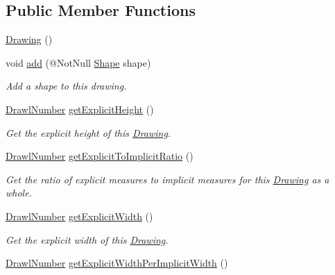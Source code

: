 \subsection*{Public Member Functions}
\begin{DoxyCompactItemize}
\item 
\hyperlink{classcom_1_1aarrelaakso_1_1drawl_1_1_drawing_adc398fbdb9acaa2c09ab8f048ff45109}{Drawing} ()
\item 
void \hyperlink{classcom_1_1aarrelaakso_1_1drawl_1_1_drawing_a4b9877c446f162bd2705a2dba4bf04bc}{add} (@Not\+Null \hyperlink{classcom_1_1aarrelaakso_1_1drawl_1_1_shape}{Shape} shape)
\begin{DoxyCompactList}\small\item\em Add a shape to this drawing. \end{DoxyCompactList}\item 
\hyperlink{classcom_1_1aarrelaakso_1_1drawl_1_1_drawl_number}{Drawl\+Number} \hyperlink{classcom_1_1aarrelaakso_1_1drawl_1_1_drawing_a348e6da7ba49b56f8ea1fad037936337}{get\+Explicit\+Height} ()
\begin{DoxyCompactList}\small\item\em Get the explicit height of this \hyperlink{classcom_1_1aarrelaakso_1_1drawl_1_1_drawing}{Drawing}. \end{DoxyCompactList}\item 
\hyperlink{classcom_1_1aarrelaakso_1_1drawl_1_1_drawl_number}{Drawl\+Number} \hyperlink{classcom_1_1aarrelaakso_1_1drawl_1_1_drawing_a586f764563210b252eef4c35b2679cd3}{get\+Explicit\+To\+Implicit\+Ratio} ()
\begin{DoxyCompactList}\small\item\em Get the ratio of explicit measures to implicit measures for this \hyperlink{classcom_1_1aarrelaakso_1_1drawl_1_1_drawing}{Drawing} as a whole. \end{DoxyCompactList}\item 
\hyperlink{classcom_1_1aarrelaakso_1_1drawl_1_1_drawl_number}{Drawl\+Number} \hyperlink{classcom_1_1aarrelaakso_1_1drawl_1_1_drawing_aa3154a900c39b56463f485f7b8b3bb5a}{get\+Explicit\+Width} ()
\begin{DoxyCompactList}\small\item\em Get the explicit width of this \hyperlink{classcom_1_1aarrelaakso_1_1drawl_1_1_drawing}{Drawing}. \end{DoxyCompactList}\item 
\hyperlink{classcom_1_1aarrelaakso_1_1drawl_1_1_drawl_number}{Drawl\+Number} \hyperlink{classcom_1_1aarrelaakso_1_1drawl_1_1_drawing_ab578293cefe01c28b1e4d8ea28f85e05}{get\+Explicit\+Width\+Per\+Implicit\+Width} ()

\end{DoxyCompactItemize}
